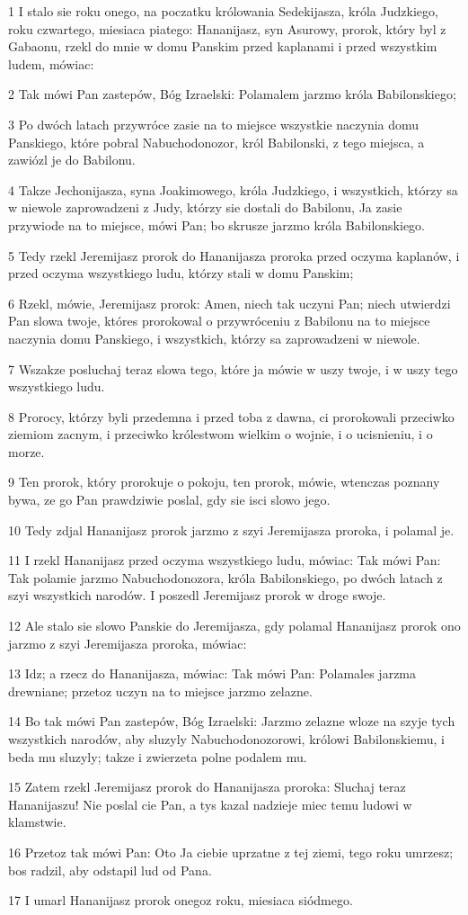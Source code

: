 \par 1 I stalo sie roku onego, na poczatku królowania Sedekijasza, króla Judzkiego, roku czwartego, miesiaca piatego: Hananijasz, syn Asurowy, prorok, który byl z Gabaonu, rzekl do mnie w domu Panskim przed kaplanami i przed wszystkim ludem, mówiac:
\par 2 Tak mówi Pan zastepów, Bóg Izraelski: Polamalem jarzmo króla Babilonskiego;
\par 3 Po dwóch latach przywróce zasie na to miejsce wszystkie naczynia domu Panskiego, które pobral Nabuchodonozor, król Babilonski, z tego miejsca, a zawiózl je do Babilonu.
\par 4 Takze Jechonijasza, syna Joakimowego, króla Judzkiego, i wszystkich, którzy sa w niewole zaprowadzeni z Judy, którzy sie dostali do Babilonu, Ja zasie przywiode na to miejsce, mówi Pan; bo skrusze jarzmo króla Babilonskiego.
\par 5 Tedy rzekl Jeremijasz prorok do Hananijasza proroka przed oczyma kaplanów, i przed oczyma wszystkiego ludu, którzy stali w domu Panskim;
\par 6 Rzekl, mówie, Jeremijasz prorok: Amen, niech tak uczyni Pan; niech utwierdzi Pan slowa twoje, któres prorokowal o przywróceniu z Babilonu na to miejsce naczynia domu Panskiego, i wszystkich, którzy sa zaprowadzeni w niewole.
\par 7 Wszakze posluchaj teraz slowa tego, które ja mówie w uszy twoje, i w uszy tego wszystkiego ludu.
\par 8 Prorocy, którzy byli przedemna i przed toba z dawna, ci prorokowali przeciwko ziemiom zacnym, i przeciwko królestwom wielkim o wojnie, i o ucisnieniu, i o morze.
\par 9 Ten prorok, który prorokuje o pokoju, ten prorok, mówie, wtenczas poznany bywa, ze go Pan prawdziwie poslal, gdy sie isci slowo jego.
\par 10 Tedy zdjal Hananijasz prorok jarzmo z szyi Jeremijasza proroka, i polamal je.
\par 11 I rzekl Hananijasz przed oczyma wszystkiego ludu, mówiac: Tak mówi Pan: Tak polamie jarzmo Nabuchodonozora, króla Babilonskiego, po dwóch latach z szyi wszystkich narodów. I poszedl Jeremijasz prorok w droge swoje.
\par 12 Ale stalo sie slowo Panskie do Jeremijasza, gdy polamal Hananijasz prorok ono jarzmo z szyi Jeremijasza proroka, mówiac:
\par 13 Idz; a rzecz do Hananijasza, mówiac: Tak mówi Pan: Polamales jarzma drewniane; przetoz uczyn na to miejsce jarzmo zelazne.
\par 14 Bo tak mówi Pan zastepów, Bóg Izraelski: Jarzmo zelazne wloze na szyje tych wszystkich narodów, aby sluzyly Nabuchodonozorowi, królowi Babilonskiemu, i beda mu sluzyly; takze i zwierzeta polne podalem mu.
\par 15 Zatem rzekl Jeremijasz prorok do Hananijasza proroka: Sluchaj teraz Hananijaszu! Nie poslal cie Pan, a tys kazal nadzieje miec temu ludowi w klamstwie.
\par 16 Przetoz tak mówi Pan: Oto Ja ciebie uprzatne z tej ziemi, tego roku umrzesz; bos radzil, aby odstapil lud od Pana.
\par 17 I umarl Hananijasz prorok onegoz roku, miesiaca siódmego.


